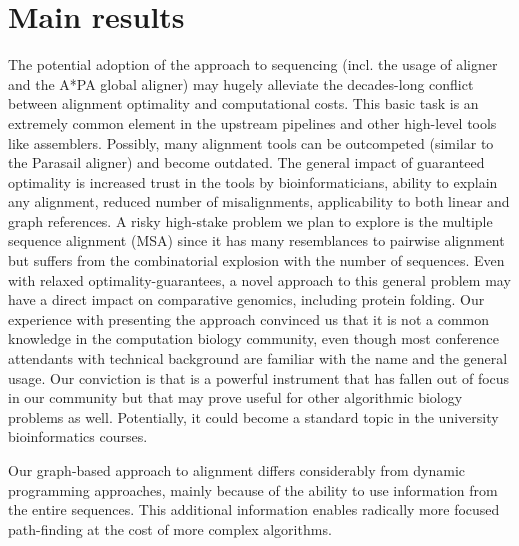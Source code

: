 \section{Main results}

The potential adoption of the \A approach to sequencing (incl. the usage of
\astarix aligner and the A*PA global aligner) may hugely alleviate the
decades-long conflict between alignment optimality and computational costs. This
basic task is an extremely common element in the upstream pipelines and other
high-level tools like assemblers. Possibly, many alignment tools can be
outcompeted (similar to the Parasail aligner) and become outdated. The general
impact of guaranteed optimality is increased trust in the tools by
bioinformaticians, ability to explain any alignment, reduced number of
misalignments, applicability to both linear and graph references. A risky
high-stake problem we plan to explore is the multiple sequence alignment (MSA)
since it has many resemblances to pairwise alignment but suffers from the
combinatorial explosion with the number of sequences. Even with relaxed
optimality-guarantees, a novel approach to this general problem may have a
direct impact on comparative genomics, including protein folding. Our experience
with presenting the \A approach convinced us that it is not a common knowledge
in the computation biology community, even though most conference attendants
with technical background are familiar with the name and the general usage. Our
conviction is that \A is a powerful instrument that has fallen out of focus in
our community but that may prove useful for other algorithmic biology problems
as well. Potentially, it could become a standard topic in the university
bioinformatics courses.

Our graph-based approach to alignment differs considerably from dynamic
programming approaches, mainly because of the ability to use information from the
entire sequences. This additional information enables radically more focused
path-finding at the cost of more complex algorithms.


